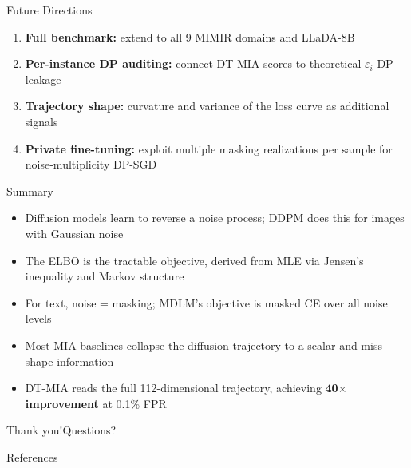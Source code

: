 \documentclass[10pt, aspectratio=169]{beamer}
\begin{document}
\begin{frame}{Future Directions}
  \begin{enumerate}
    \item \textbf{Full benchmark:} extend to all 9 MIMIR domains and LLaDA-8B
    \item \textbf{Per-instance DP auditing:} connect DT-MIA scores to theoretical $\varepsilon_i$-DP leakage
    \item \textbf{Trajectory shape:} curvature and variance of the loss curve as additional signals
    \item \textbf{Private fine-tuning:} exploit multiple masking realizations per sample for noise-multiplicity DP-SGD
  \end{enumerate}
\end{frame}

\begin{frame}{Summary}
  \begin{itemize}
    \item Diffusion models learn to reverse a noise process; DDPM does this for images with Gaussian noise
    \item The ELBO is the tractable objective, derived from MLE via Jensen's inequality and Markov structure
    \item For text, noise = masking; MDLM's objective is masked CE over all noise levels
    \item Most MIA baselines collapse the diffusion trajectory to a scalar and miss shape information
    \item DT-MIA reads the full 112-dimensional trajectory, achieving \textbf{40$\times$ improvement} at 0.1\% FPR
  \end{itemize}
  \vspace{14pt}
  \begin{center}
    \Large Thank you!\quad Questions?
  \end{center}
\end{frame}

\begin{frame}[allowframebreaks]{References}
  
  
\end{frame}
\end{document}
